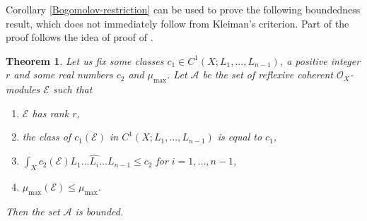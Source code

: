 \documentclass[12pt]{article}
\theoremstyle{plain}
\newtheorem{Theorem}[Thm]{\sc Theorem}
\theoremstyle{definition}
\theoremstyle{remark}
\newcommand{\cA}{{\mathcal A}}
\newcommand{\cE}{{\mathcal E}}
\newcommand{\cO}{{\mathcal O}}
\begin{document}
\medskip


Corollary \ref{Bogomolov-restriction}  can be used to prove the following boundedness result, which
does not immediately follow from Kleiman's criterion. Part of the proof follows the idea of proof of \cite[Theorem 3.4]{La-PSPUM}.

\begin{Theorem} \label{boundedness}
Let us fix some classes $c_{1}\in C^1(X;L_1,...,L_{n-1})$, a positive integer $r$  and some real numbers $c_2$ and $\mu _{\max}$.  
Let $\cA$ be the set of reflexive coherent $\cO_X$-modules $\cE$ such that 
\begin{enumerate}
\item $\cE$ has  rank $r$, 
\item the class of $c_1(\cE)$ in $C^1(X;L_1,...,L_{n-1})$ is equal to $c_{1}$,
\item $\int _X c_2 (\cE) L_1...\widehat{L_i}...L_{n-1} \le c_2$ for $i=1,...,n-1$,
\item $\mu _{\max } (\cE)\le \mu _{\max}$.
\end{enumerate}
Then the set $\cA$ is bounded.
\end{Theorem}
\end{document}
